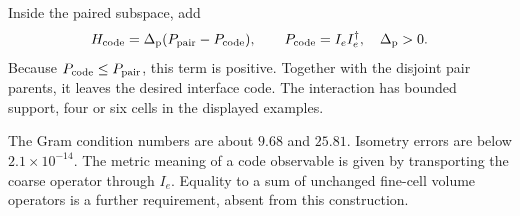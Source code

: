 Inside the paired subspace, add
\begin{equation}
H_{\rm code}=\Delta_{\rm p}(P_{\rm pair}-P_{\rm code}),
\qquad P_{\rm code}=I_eI_e^\dagger,\quad \Delta_{\rm p}>0.
\end{equation}
Because $P_{\rm code}\le P_{\rm pair}$, this term is positive. Together with the disjoint pair parents, it leaves the desired interface code. The interaction has bounded support, four or six cells in the displayed examples.

The Gram condition numbers are about $9.68$ and $25.81$. Isometry errors are below $2.1\times10^{-14}$. The metric meaning of a code observable is given by transporting the coarse operator through $I_e$. Equality to a sum of unchanged fine-cell volume operators is a further requirement, absent from this construction.
